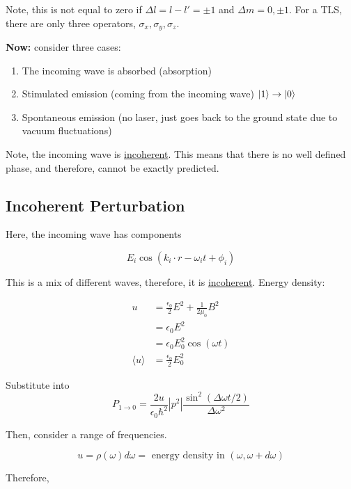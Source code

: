 \documentclass{article}
\newtheorem{one minute paper}[theorem]{One Minute Paper}
\begin{document}
Note, this is not equal to zero if $\Delta l =  l - l' = \pm 1$ and $\Delta m = 0, \pm 1$. 
For a TLS, there are only three operators, $\sigma_x, \sigma_y, \sigma_z$. 

\textbf{Now:} consider three cases: 

\begin{enumerate}
    \item The incoming wave is absorbed (absorption)
    \item Stimulated emission (coming from the incoming wave) $\ket{1} \rightarrow \ket{0}$
    \item Spontaneous emission (no laser, just goes back to the ground state due to vacuum fluctuations) 
\end{enumerate}

Note, the incoming wave is \underline{incoherent}. This means that there is no well defined phase, and therefore, cannot be exactly predicted. 

\subsection*{Incoherent Perturbation}

Here, the incoming wave has components 

\begin{equation}
    E_i \cos(k_i \cdot r - \omega_i t + \phi_i)
\end{equation}

This is a mix of different waves, therefore, it is \underline{incoherent}. Energy density:

\begin{align*}
    u &= \frac{\epsilon_0}{2}E^2 + \frac{1}{2\mu_0}B^2\\
    &= \epsilon_0E^2\\
    &= \epsilon_0 E_0^2\cos(\omega t) \\
    \langle u \rangle &= \frac{\epsilon_0}{2}E_0^2
\end{align*}

Substitute into $$P_{1 \rightarrow 0} = \frac{2u}{\epsilon_0 \hbar^2}|p^2| \frac{\sin^2(\Delta \omega t/2)}{\Delta \omega^2}$$

Then, consider a range of frequencies. 

\begin{equation}
    u = \rho(\omega)d\omega = \text{ energy density in $(\omega, \omega + d\omega)$}
\end{equation}

Therefore, 
\end{document}
